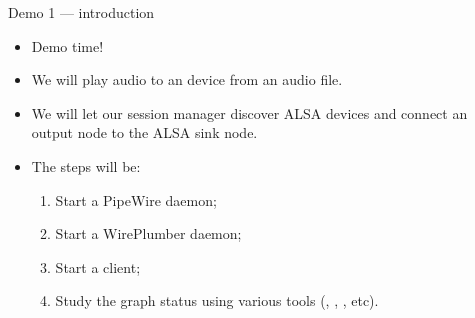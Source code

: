 \begin{frame}{Demo 1 — introduction}
  \begin{itemize}

  \item Demo time!

  \item We will play audio to an  device from an audio
    file.

  \item We will let our session manager discover ALSA devices and
    connect an output node to the ALSA sink node.

  \item The steps will be:

    \begin{enumerate}
    \item Start a PipeWire daemon;
    \item Start a WirePlumber daemon;
    \item Start a  client;
    \item Study the graph status using various tools (,
      , , etc).
    \end{enumerate}

  \end{itemize}
\end{frame}



